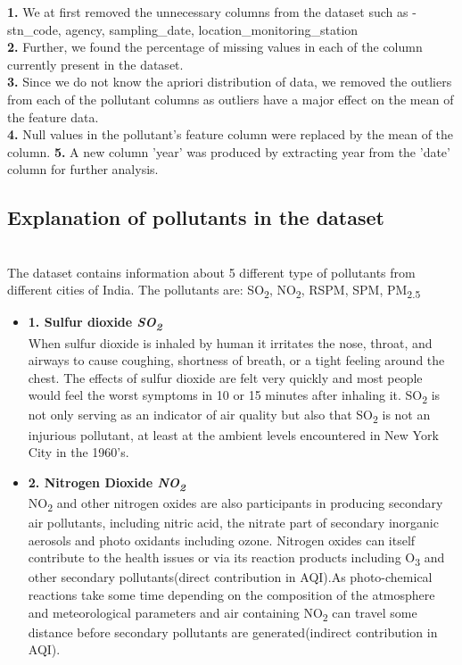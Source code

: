 \documentclass{article}
\begin{document}
\begin{itemize}
\begin{itemize}
    \textbf{1. }We at first removed the unnecessary columns from the dataset such as - \\ stn\_code, agency, sampling\_date, location\_monitoring\_station \\
    
    \textbf{2.} Further, we found the percentage of missing values in each of the column currently present in the dataset.  \\
     
    \textbf{3.} Since we do not know the apriori distribution of data, we removed the outliers from each of the pollutant columns as outliers have a major effect on the mean of the feature data. \\ 
    \textbf{4.} Null values in the pollutant's feature column were replaced by the mean of the column.
    \textbf{5.} A new column 'year' was produced by extracting year from the 'date' column for further analysis.
    \end{itemize}
    \subsection{\color{brown} Explanation of pollutants in the dataset}\\
    The dataset contains information about 5 different type of pollutants from different cities of India.
    The pollutants are: SO\textsubscript{2}, NO\textsubscript{2}, RSPM, SPM, PM\textsubscript{2.5}
    \begin{itemize}
        \item {\textbf{1. Sulfur dioxide \textit{SO\textsubscript{2}}}\\
    When sulfur dioxide is inhaled by human it irritates the nose, throat, and airways to cause coughing, shortness of breath, or a tight feeling around the chest. The effects of sulfur dioxide are felt very quickly and most people would feel the worst symptoms in 10 or 15 minutes after inhaling it.
    SO\textsubscript{2} is not only serving as an indicator of air quality but also that SO\textsubscript{2} is not
    an injurious pollutant, at least at the
    ambient levels encountered in New
    York City in the 1960's.\textsuperscript{\cite{ref5}}
    }
    \item {\textbf{2. Nitrogen Dioxide \textit{NO\textsubscript{2}}}\\
    NO\textsubscript{2} and other nitrogen oxides are also participants in producing secondary air pollutants, including nitric acid, the nitrate part of secondary inorganic aerosols and photo oxidants including ozone.
    Nitrogen oxides can itself contribute to the health issues or via its reaction products including O\textsubscript{3} and other secondary pollutants(direct contribution in AQI).As photo-chemical reactions take some time depending on the composition of the atmosphere and meteorological parameters and air containing NO\textsubscript{2} can travel some distance before secondary pollutants are generated(indirect contribution in AQI).}
    

\end{itemize}
\end{itemize}
\end{document}
